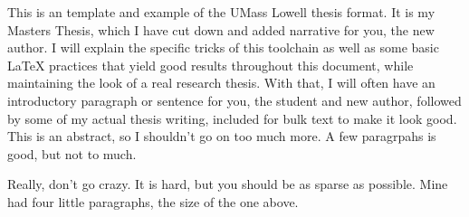 % 
% 
%

This is an template and example of the UMass Lowell thesis format. It is my Masters Thesis, which I have cut down and added narrative for you, the new author. I will explain the specific tricks of this toolchain as well as some basic LaTeX practices that yield good results throughout this document, while maintaining the look of a real research thesis. With that, I will often have an introductory paragraph or sentence for you, the student and new author, followed by some of my actual thesis writing, included for bulk text to make it look good. This is an abstract, so I shouldn't go on too much more. A few paragrpahs is good, but not to much.

Really, don't go crazy. It is hard, but you should be as sparse as possible. Mine had four little paragraphs, the size of the one above.
